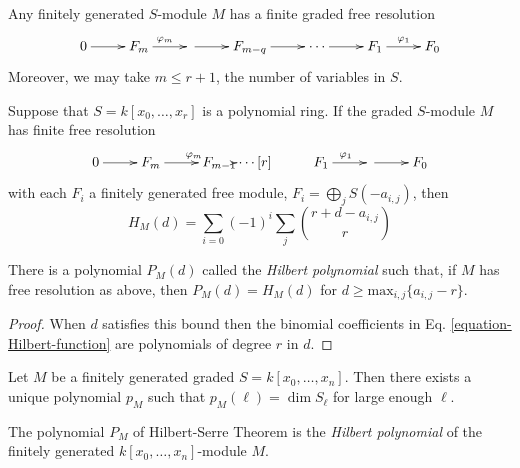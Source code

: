 \begin{theorem}
\label{theorem-Hilbert-syzygy}
\begin{reference}
\cite[Theorem 1.1]{sys}
\end{reference}
Any finitely generated $S$-module $M$ has a finite graded free resolution
$$
\xymatrix{
0\ar[r]&F_m\ar[r]^{\varphi_m}&\ar[r]&F_{m-q}\ar[r]&\cdots\ar[r]&
F_1\ar[r]^{\varphi_1}&F_0
}
$$
Moreover, we may take $m\leq r+1$, the number of variables in $S$.
\end{theorem}

\begin{lemma}
\label{lemma-Hilbert-function}
Suppose that $S=k[x_0,\ldots,x_r]$ is a polynomial ring. If the graded
$S$-module $M$ has finite free resolution
$$
\xymatrix{
0\ar[r]&F_m\ar[r]^{\varphi_m}&F_{m-1}\ar\cdots[r]&F_1\ar[r]^{\varphi_1}&
\ar[r]&F_0
}
$$
with each $F_i$ a finitely generated free module,
$F_i=\bigoplus_{j}S(-a_{i,j})$, then
\begin{equation}
\label{equation-Hilbert-function}
H_M(d)=\sum_{i=0}(-1)^i\sum_{j}\binom{r+d-a_{i,j}}{r}
\end{equation}
\end{lemma}

\begin{lemma}
\label{lemma-Hilbert-function-becomes-polynomial}
There is a polynomial $P_M(d)$ called the {\it Hilbert polynomial} such that, if
$M$ has free resolution as above, then $P_M(d)=H_M(d)$ for 
$d\geq\text{max}_{i,j}\{a_{i,j}-r\}$.
\end{lemma}

\begin{proof}
When $d$ satisfies this bound then the binomial coefficients in Eq.
\ref{equation-Hilbert-function} are polynomials of degree $r$ in $d$.
\end{proof}

\begin{theorem}
\label{theorem-Hilbert-Serre}
\begin{reference}
\cite[I, Theorem 7.5]{hart}
\end{reference}
Let $M$ be a finitely generated graded $S=k[x_0,\ldots,x_n]$. Then there exists
a unique polynomial $p_M$ such that $p_M(\ell)=\dim S_\ell$ for large enough
$\ell$.
\end{theorem}

\begin{definition}
\label{definition-Hilbert-polynomial}
\begin{reference}
\cite[I, p. 52]{har}
\end{reference}
The polynomial $P_M$ of Hilbert-Serre Theorem \cite{Hilbert-Serre} is the {\it
Hilbert polynomial} of the finitely generated $k[x_0,\ldots,x_n]$-module $M$.
\end{definition}

